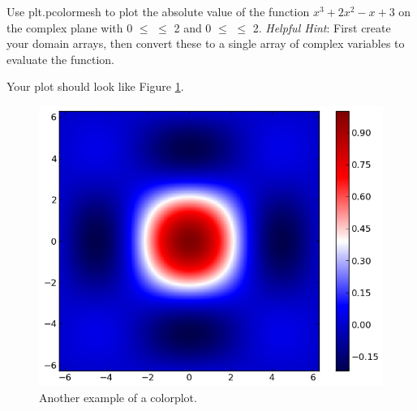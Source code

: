 \begin{problem} Use plt.pcolormesh to plot the absolute value of the function $x^3 +2x^2 -x +3$ on the complex plane with 0 $\leq$  $\leq$ 2 and 0 $\leq$  $\leq$ 2.
\emph{Helpful Hint}: First create your domain arrays, then convert these to a single array of complex variables to evaluate the function.

Your plot should look like Figure \ref{fig:pcolormesh}.

\begin{figure}[H]
\includegraphics[width=\textwidth]{pcolor2.png}
\caption{Another example of a colorplot.}
\label{fig:pcolormesh}
\end{figure}
\end{problem}

